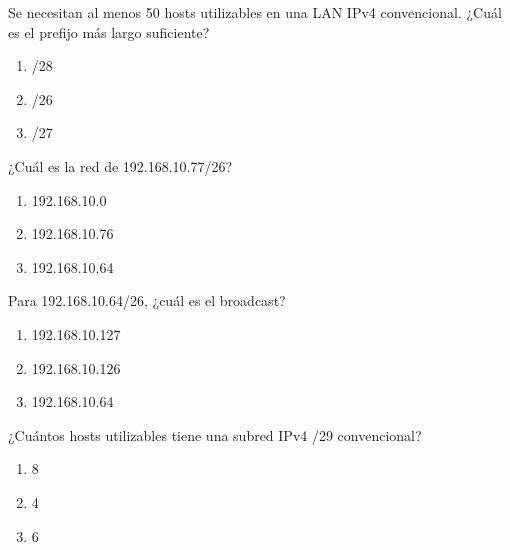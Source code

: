 \noindent\begin{minipage}{\linewidth}\setlength{\parskip}{4pt}\label{q:R-009}
Se necesitan al menos 50 hosts utilizables en una LAN IPv4 convencional. ¿Cuál es el prefijo más largo suficiente?
\begin{enumerate}[label=\Alph*),nosep]
\item /28
\item /26
\item /27
\end{enumerate}\end{minipage}\par\medskip

\noindent\begin{minipage}{\linewidth}\setlength{\parskip}{4pt}\label{q:R-010}
¿Cuál es la red de 192.168.10.77/26?
\begin{enumerate}[label=\Alph*),nosep]
\item 192.168.10.0
\item 192.168.10.76
\item 192.168.10.64
\end{enumerate}\end{minipage}\par\medskip

\noindent\begin{minipage}{\linewidth}\setlength{\parskip}{4pt}\label{q:R-011}
Para 192.168.10.64/26, ¿cuál es el broadcast?
\begin{enumerate}[label=\Alph*),nosep]
\item 192.168.10.127
\item 192.168.10.126
\item 192.168.10.64
\end{enumerate}\end{minipage}\par\medskip

\noindent\begin{minipage}{\linewidth}\setlength{\parskip}{4pt}\label{q:R-012}
¿Cuántos hosts utilizables tiene una subred IPv4 /29 convencional?
\begin{enumerate}[label=\Alph*),nosep]
\item 8
\item 4
\item 6
\end{enumerate}\end{minipage}\par\medskip

